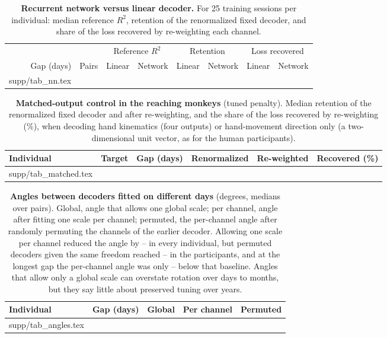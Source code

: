 \documentclass[pdflatex,sn-nature]{sn-jnl}
\makeatletter
\newcommand\tabinput[1]{\@@input #1 }
\makeatother
\begin{document}
\begin{table}[p]
\caption{\textbf{Recurrent network versus linear decoder.} For 25 training sessions per individual: median reference
$R^2$, retention of the renormalized fixed decoder, and share of the loss recovered by re-weighting each channel.}
\label{tab:nn}
\scriptsize\setlength{\tabcolsep}{3.5pt}
\begin{tabular}{@{}rrrrrrrr@{}}
\toprule
& & \multicolumn{2}{c}{Reference $R^2$} & \multicolumn{2}{c}{Retention} & \multicolumn{2}{c}{Loss recovered} \\
\cmidrule{3-4}\cmidrule{5-6}\cmidrule{7-8}
Gap (days) & Pairs & Linear & Network & Linear & Network & Linear & Network \\
\midrule
\tabinput{supp/tab_nn.tex}
\botrule
\end{tabular}
\end{table}

\begin{table}[p]
\caption{\textbf{Matched-output control in the reaching monkeys} (tuned penalty). Median retention of the renormalized
fixed decoder and after re-weighting, and the share of the loss recovered by re-weighting (\%), when decoding hand
kinematics (four outputs) or hand-movement direction only (a two-dimensional unit vector, as for the human
participants).}
\label{tab:matched}
\scriptsize\setlength{\tabcolsep}{3.5pt}
\begin{tabular}{@{}llrrrr@{}}
\toprule
Individual & Target & Gap (days) & Renormalized & Re-weighted & Recovered (\%) \\
\midrule
\tabinput{supp/tab_matched.tex}
\botrule
\end{tabular}
\end{table}

\begin{table}[p]
\caption{\textbf{Angles between decoders fitted on different days} (degrees, medians over pairs). Global, angle that
allows one global scale; per channel, angle after fitting one scale per channel; permuted, the per-channel angle
after randomly permuting the channels of the earlier decoder. Allowing one scale per channel reduced the angle by
--\textdegree{} in every individual, but permuted decoders given the same freedom reached
--\textdegree{} in the participants, and at the longest gap the per-channel
angle was only --\textdegree{} below that baseline. Angles that allow only a
global scale can overstate rotation over days to months, but they say little about preserved tuning over years.}
\label{tab:angles}
\scriptsize\setlength{\tabcolsep}{3.5pt}
\begin{tabular}{@{}lrrrr@{}}
\toprule
Individual & Gap (days) & Global & Per channel & Permuted \\
\midrule
\tabinput{supp/tab_angles.tex}
\botrule
\end{tabular}
\end{table}
\end{document}
